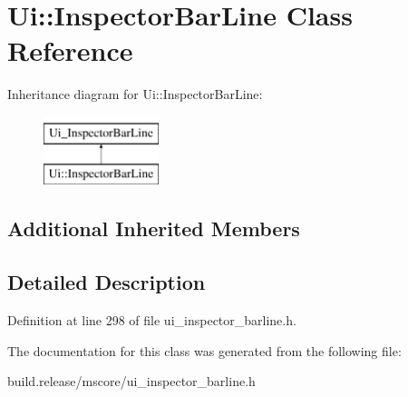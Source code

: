\hypertarget{class_ui_1_1_inspector_bar_line}{}\section{Ui\+:\+:Inspector\+Bar\+Line Class Reference}
\label{class_ui_1_1_inspector_bar_line}
Inheritance diagram for Ui\+:\+:Inspector\+Bar\+Line\+:\begin{figure}[H]
\begin{center}
\leavevmode
\includegraphics[height=2.000000cm]{class_ui_1_1_inspector_bar_line}
\end{center}
\end{figure}
\subsection*{Additional Inherited Members}


\subsection{Detailed Description}


Definition at line 298 of file ui\+\_\+inspector\+\_\+barline.\+h.



The documentation for this class was generated from the following file\+:\begin{DoxyCompactItemize}
\item 
build.\+release/mscore/ui\+\_\+inspector\+\_\+barline.\+h\end{DoxyCompactItemize}

